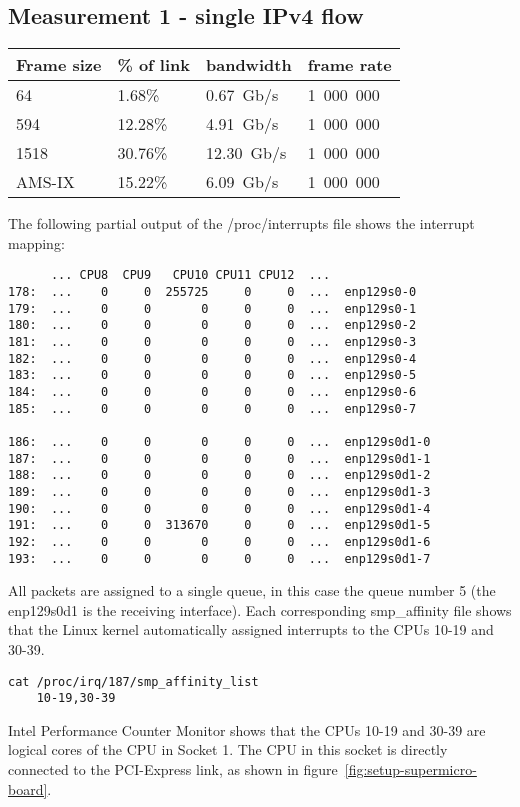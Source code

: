 
\subsection{Measurement 1 - single IPv4 flow}
\begin{tabular}{ | l | l | l | l | }
\hline
Frame size & \% of link & bandwidth & frame rate \\
\hline
64     &  1.68\% &  0.67~Gb/s & 1~000~000 \\
594    & 12.28\% &  4.91~Gb/s & 1~000~000 \\
1518   & 30.76\% & 12.30~Gb/s & 1~000~000 \\
AMS-IX & 15.22\% &  6.09~Gb/s & 1~000~000 \\
\hline
\end{tabular}

The following partial output of the /proc/interrupts file shows the interrupt mapping:
\begin{lstlisting}
      ... CPU8  CPU9   CPU10 CPU11 CPU12  ...
178:  ...    0     0  255725     0     0  ...  enp129s0-0
179:  ...    0     0       0     0     0  ...  enp129s0-1
180:  ...    0     0       0     0     0  ...  enp129s0-2
181:  ...    0     0       0     0     0  ...  enp129s0-3
182:  ...    0     0       0     0     0  ...  enp129s0-4
183:  ...    0     0       0     0     0  ...  enp129s0-5
184:  ...    0     0       0     0     0  ...  enp129s0-6
185:  ...    0     0       0     0     0  ...  enp129s0-7

186:  ...    0     0       0     0     0  ...  enp129s0d1-0
187:  ...    0     0       0     0     0  ...  enp129s0d1-1
188:  ...    0     0       0     0     0  ...  enp129s0d1-2
189:  ...    0     0       0     0     0  ...  enp129s0d1-3
190:  ...    0     0       0     0     0  ...  enp129s0d1-4
191:  ...    0     0  313670     0     0  ...  enp129s0d1-5
192:  ...    0     0       0     0     0  ...  enp129s0d1-6
193:  ...    0     0       0     0     0  ...  enp129s0d1-7
\end{lstlisting}
All packets are assigned to a single queue, in this case the queue number 5 (the enp129s0d1 is the receiving interface).
Each corresponding smp\_affinity file shows that the Linux kernel
automatically assigned interrupts to the CPUs 10-19 and 30-39.
\begin{lstlisting}
cat /proc/irq/187/smp_affinity_list
	10-19,30-39
\end{lstlisting}
Intel Performance Counter Monitor shows that the CPUs 10-19 and 30-39 are
logical cores of the CPU in Socket 1.
The CPU in this socket is directly connected to the PCI-Express link, as shown in figure~\ref{fig:setup-supermicro-board}.

